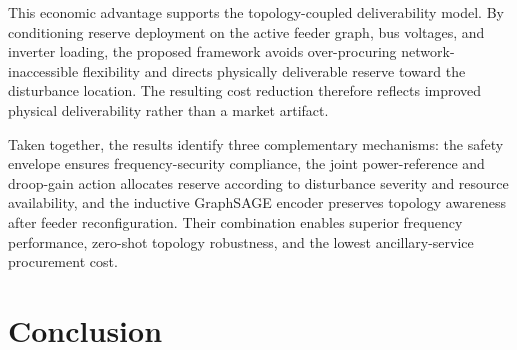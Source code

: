 \documentclass[lettersize,journal]{IEEEtran}
\begin{document}
	
	This economic advantage supports the topology-coupled deliverability model. By conditioning reserve deployment on the active feeder graph, bus voltages, and inverter loading, the proposed framework avoids over-procuring network-inaccessible flexibility and directs physically deliverable reserve toward the disturbance location. The resulting cost reduction therefore reflects improved physical deliverability rather than a market artifact.
	
	
	\begin{table}[!th]
		\caption{Mean normalized FFR procurement cost (C/MWh) over $N=10$ episodes per scenario
		}
		\label{tab:cost_mwh}
		\centering
		\footnotesize
	\end{table}
	
	
	Taken together, the results identify three complementary mechanisms: the safety envelope ensures frequency-security compliance, the joint power-reference and droop-gain action allocates reserve according to disturbance severity and resource availability, and the inductive GraphSAGE encoder preserves topology awareness after feeder reconfiguration. Their combination enables superior frequency performance, zero-shot topology robustness, and the lowest ancillary-service procurement cost.
	
	
	
	\section{Conclusion}
	\label{sec:conclusion}
	
\end{document}
